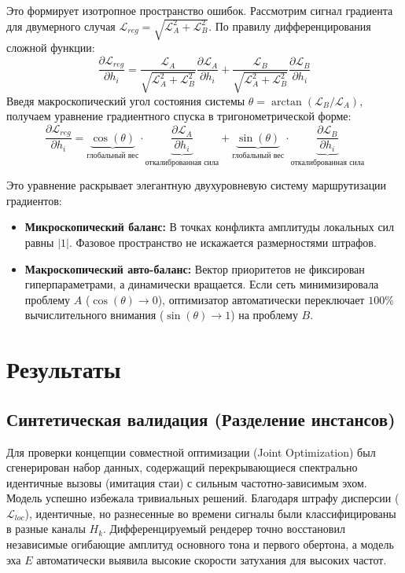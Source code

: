 \documentclass[11pt,a4paper]{article}
\begin{document}
Это формирует изотропное пространство ошибок. Рассмотрим сигнал градиента для двумерного случая $\mathcal{L}_{reg} = \sqrt{\mathcal{L}_A^2 + \mathcal{L}_B^2}$. По правилу дифференцирования сложной функции:
\begin{equation}
\frac{\partial \mathcal{L}_{reg}}{\partial h_i} = \frac{\mathcal{L}_A}{\sqrt{\mathcal{L}_A^2 + \mathcal{L}_B^2}} \frac{\partial \mathcal{L}_A}{\partial h_i} + \frac{\mathcal{L}_B}{\sqrt{\mathcal{L}_A^2 + \mathcal{L}_B^2}} \frac{\partial \mathcal{L}_B}{\partial h_i}
\end{equation}
Введя макроскопический угол состояния системы $\theta = \arctan (\mathcal{L}_B / \mathcal{L}_A)$, получаем уравнение градиентного спуска в тригонометрической форме:
\begin{equation}
\frac{\partial \mathcal{L}_{reg}}{\partial h_i} = \underbrace{\cos(\theta)}_{\text{глобальный вес}} \cdot \underbrace{\frac{\partial \mathcal{L}_A}{\partial h_i}}_{\text{откалиброванная сила}} + \underbrace{\sin(\theta)}_{\text{глобальный вес}} \cdot \underbrace{\frac{\partial \mathcal{L}_B}{\partial h_i}}_{\text{откалиброванная сила}}
\end{equation}

Это уравнение раскрывает элегантную двухуровневую систему маршрутизации градиентов:
\begin{itemize}
    \item \textbf{Микроскопический баланс:} В точках конфликта амплитуды локальных сил равны $|1|$. Фазовое пространство не искажается размерностями штрафов.
    \item \textbf{Макроскопический авто-баланс:} Вектор приоритетов не фиксирован гиперпараметрами, а динамически вращается. Если сеть минимизировала проблему $A$ ($\cos(\theta) \to 0$), оптимизатор автоматически переключает $100\%$ вычислительного внимания ($\sin(\theta) \to 1$) на проблему $B$.
\end{itemize}

\section{Результаты}

\subsection{Синтетическая валидация (Разделение инстансов)}
Для проверки концепции совместной оптимизации (Joint Optimization) был сгенерирован набор данных, содержащий перекрывающиеся спектрально идентичные вызовы (имитация стаи) с сильным частотно-зависимым эхом.
Модель успешно избежала тривиальных решений. Благодаря штрафу дисперсии ($\mathcal{L}_{loc}$), идентичные, но разнесенные во времени сигналы были классифицированы в разные каналы $H_k$. Дифференцируемый рендерер точно восстановил независимые огибающие амплитуд основного тона и первого обертона, а модель эха $E$ автоматически выявила высокие скорости затухания для высоких частот.
\end{document}
